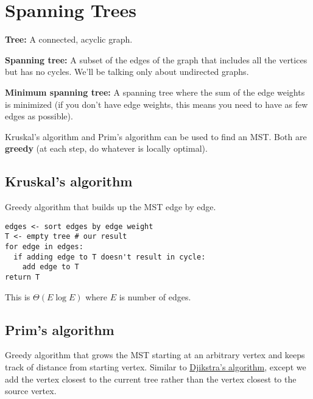 \section{Spanning Trees}

\textbf{Tree:} A connected, acyclic graph.

\textbf{Spanning tree:} A subset of the edges of the graph that includes all the vertices but has no cycles. We'll be talking only about undirected graphs.

\textbf{Minimum spanning tree:} A spanning tree where the sum of the edge weights is minimized (if you don't have edge weights, this means you need to have as few edges as possible).

Kruskal's algorithm and Prim's algorithm can be used to find an MST. Both are \textbf{greedy} (at each step, do whatever is locally optimal).

\subsection{Kruskal's algorithm}

Greedy algorithm that builds up the MST edge by edge.

\begin{verbatim}
edges <- sort edges by edge weight
T <- empty tree # our result
for edge in edges:
  if adding edge to T doesn't result in cycle:
    add edge to T
return T
\end{verbatim}

This is $\Theta(E \log E)$ where $E$ is number of edges.\\

\subsection{Prim's algorithm}
\label{sec:prims-algorithm}

Greedy algorithm that grows the MST starting at an arbitrary vertex and keeps track of distance from starting vertex. Similar to \hyperref[sec:dijkstras]{Djikstra's algorithm}, except we add the vertex closest to the current tree rather than the vertex closest to the source vertex.

